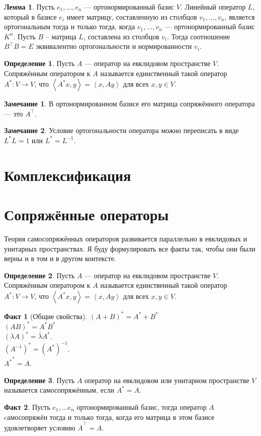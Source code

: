 \documentclass[10pt,a4paper,oneside]{book}
\theoremstyle{definition}
\newtheorem*{rem}{Замечание}
\newtheorem{defn}{Определение}
\newtheorem*{fact}{Факт}
\newtheorem{lem}{Лемма}
\newcommand{\ovl}{\overline}
\def\lan{\left\langle }
\def\ran{\right\rangle}
\def\dfn{\begin{defn}}
\def\edfn{\end{defn}}
\def\lm{\begin{lem}}
\def\elm{\end{lem}}
\def\rm{\begin{rem}}
\def\erm{\end{rem}}
\def\fct{\begin{fact}}
\def\efct{\end{fact}}
\begin{document}
\lm Пусть $e_1,\dots,e_n$ --- ортонормированный базис $V$. Линейный оператор $L$, который в базисе $e_i$ имеет матрицу, составленную из столбцов $v_1,\dots,v_n$, является ортогональным тогда и только тогда, когда $v_1,\dots,v_n$ --- ортонормированный базис $K^n$. 
\proof
Пусть $B$ -- матрица $L$, составлена из столбцов $v_i$. Тогда соотношение $B^{\top}B=E$ эквивалентно ортогональности и нормированности $v_i$.
\endproof
\elm



\dfn Пусть $A$ --- оператор на евклидовом пространстве $V$. Сопряжённым оператором к $A$ называется единственный такой оператор $A^*\colon V \to V$, что $\lan A^*x,y\ran=\lan x,Ay\ran$ для всех $x,y \in V$.
\edfn

\rm
В ортонормированном базисе его матрица сопряжённого оператора --- это $A^{\top}$. 
\erm

\rm Условие ортогональности оператора можно переписать в виде $L^*L=1$ или $L^*=L^{-1}$.
\erm






\section{Комплексификация}

\section{Сопряжённые операторы}

Теория самосопряжённых операторов развивается параллельно в евклидовых и унитарных пространствах. Я буду формулировать все факты так, чтобы они были верны и в том и в другом контексте.

\dfn Пусть $A$ --- оператор на евклидовом пространстве $V$. Сопряжённым оператором к $A$ называется единственный такой оператор $A^*\colon V \to V$, что $\lan A^*x,y\ran=\lan x,Ay\ran$ для всех $x,y \in V$.
\edfn


\fct[Общие свойства]
$(A+B)^*=A^*+B^*$\\
$(AB)^*=A^*B^*$\\
$(\lambda A)^*=\ovl{\lambda}A^*$.\\
$(A^{-1})^*=(A^*)^{-1}$.\\
${A^*}^*=A$.
\efct

\dfn Пусть $A$ оператор на евклидовом или унитарном пространстве $V$ называется самосопряжённым, если $A^*=A$.
\edfn

\fct Пусть $e_1,\dots e_n$ ортонормированный базис, тогда оператор $A$ cамосопряжён тогда и только тогда, когда его матрица в этом базисе удовлетворяет условию $\ovl{A}^{\top}=A$.
\efct
\end{document}
